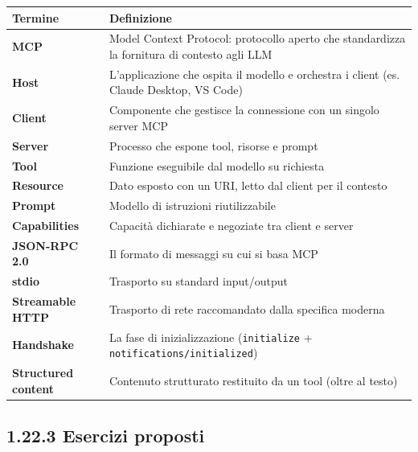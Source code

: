 \documentclass[
  italian,
  10pt,
]{book}
\newcounter{none} %
\begin{document}
{\def\LTcaptype{none} %
\begin{longtable}[]{@{}
  >{\raggedright\arraybackslash}p{}
  >{\raggedright\arraybackslash}p{}@{}}
\toprule\noalign{}
\begin{minipage}[b]{\linewidth}\raggedright
Termine
\end{minipage} & \begin{minipage}[b]{\linewidth}\raggedright
Definizione
\end{minipage} \\
\midrule\noalign{}
\endhead
\bottomrule\noalign{}
\endlastfoot
\textbf{MCP} & Model Context Protocol: protocollo aperto che
standardizza la fornitura di contesto agli LLM \\
\textbf{Host} & L'applicazione che ospita il modello e orchestra i
client (es. Claude Desktop, VS Code) \\
\textbf{Client} & Componente che gestisce la connessione con un singolo
server MCP \\
\textbf{Server} & Processo che espone tool, risorse e prompt \\
\textbf{Tool} & Funzione eseguibile dal modello su richiesta \\
\textbf{Resource} & Dato esposto con un URI, letto dal client per il
contesto \\
\textbf{Prompt} & Modello di istruzioni riutilizzabile \\
\textbf{Capabilities} & Capacità dichiarate e negoziate tra client e
server \\
\textbf{JSON-RPC 2.0} & Il formato di messaggi su cui si basa MCP \\
\textbf{stdio} & Trasporto su standard input/output \\
\textbf{Streamable HTTP} & Trasporto di rete raccomandato dalla
specifica moderna \\
\textbf{Handshake} & La fase di inizializzazione (\texttt{initialize} +
\texttt{notifications/initialized}) \\
\textbf{Structured content} & Contenuto strutturato restituito da un
tool (oltre al testo) \\
\end{longtable}
}

\subsection{1.22.3 Esercizi proposti}\label{esercizi-proposti}
\end{document}
